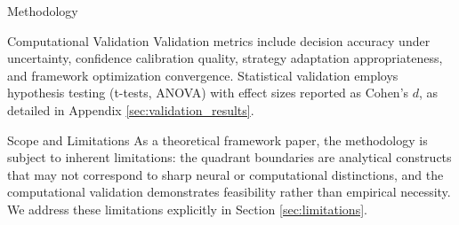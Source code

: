 \documentclass[
  ignorenonframetext,
]{beamer}
\begin{document}
\begin{frame}[fragile]{Methodology}
\begin{block}{Computational Validation}
Validation metrics include decision accuracy under uncertainty,
confidence calibration quality, strategy adaptation appropriateness, and
framework optimization convergence. Statistical validation employs
hypothesis testing (t-tests, ANOVA) with effect sizes reported as
Cohen's \(d\), as detailed in Appendix \ref{sec:validation_results}.
\end{block}

\begin{block}{Scope and Limitations}
\protect{}\label{scope-and-limitations}
As a theoretical framework paper, the methodology is subject to inherent
limitations: the quadrant boundaries are analytical constructs that may
not correspond to sharp neural or computational distinctions, and the
computational validation demonstrates feasibility rather than empirical
necessity. We address these limitations explicitly in Section
\ref{sec:limitations}.
\end{block}
\end{frame}
\end{document}
